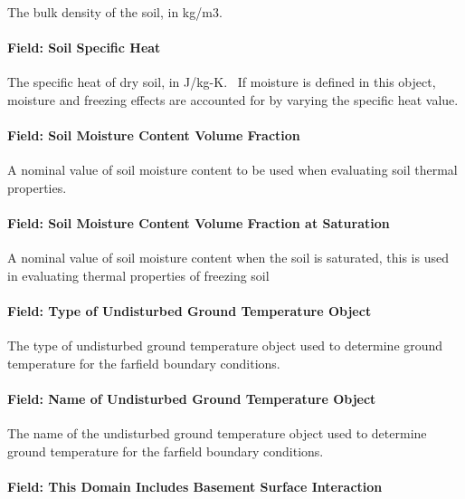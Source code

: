 The bulk density of the soil, in kg/m3.

\paragraph{Field: Soil Specific Heat}\label{field-soil-specific-heat-001}

The specific heat of dry soil, in J/kg-K.~ If moisture is defined in this object, moisture and freezing effects are accounted for by varying the specific heat value.

\paragraph{Field: Soil Moisture Content Volume Fraction}\label{field-soil-moisture-content-volume-fraction-000}

A nominal value of soil moisture content to be used when evaluating soil thermal properties.

\paragraph{Field: Soil Moisture Content Volume Fraction at Saturation}\label{field-soil-moisture-content-volume-fraction-at-saturation-000}

A nominal value of soil moisture content when the soil is saturated, this is used in evaluating thermal properties of freezing soil

\paragraph{Field: Type of Undisturbed Ground Temperature Object}\label{field-type-of-undisturbed-ground-temperature-object-1-001}

The type of undisturbed ground temperature object used to determine ground temperature for the farfield boundary conditions.

\paragraph{Field: Name of Undisturbed Ground Temperature Object}\label{field-name-of-undisturbed-ground-temperature-object-1-001}

The name of the undisturbed ground temperature object used to determine ground temperature for the farfield boundary conditions.

\paragraph{Field: This Domain Includes Basement Surface Interaction}\label{field-this-domain-includes-basement-surface-interaction}

